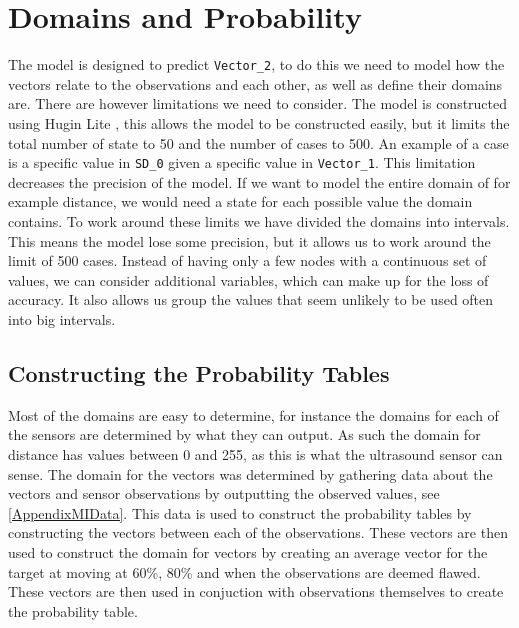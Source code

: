 \section{Domains and Probability}\label{MID}

The model is designed to predict \texttt{Vector\_2}, to do this we need to
model how the vectors relate to the observations and each other, as well as
define their domains are. There are however limitations we need to consider. The
model is constructed using Hugin Lite \citep{Hugin}, this allows the model to
be constructed easily, but it limits the total number of state to 50 and
the number of cases to 500. An example of a case is a specific value in \texttt{SD\_0}
given a specific value in \texttt{Vector\_1}. This limitation decreases the
precision of the model. If we want to model the entire domain of for example
distance, we would need a state for each possible value the domain
contains. To work around these limits we have divided
the domains into intervals. This means the model lose some precision, but it
allows us to work around the limit of 500 cases. Instead of having only a few
nodes with a continuous set of values, we can consider additional variables,
which can  make up for the loss of accuracy. It also allows us group the values
that seem unlikely to be used often into big intervals.


\subsection{Constructing the Probability Tables}

Most of the domains are easy to determine, for instance the domains for each of
the sensors are determined by what they can output. As such the domain for
distance has values between 0 and 255, as this is what the ultrasound sensor
can sense. The domain for the vectors was determined by gathering data about the
vectors and sensor observations by outputting the observed values, see
\autoref{AppendixMIData}. This data is used to construct the
probability tables by constructing the vectors between each of the
observations. These vectors are then used to construct the domain for vectors by creating an average vector for
the target at moving at 60\%, 80\% and when the observations are deemed flawed.
These vectors are then used in conjuction with observations themselves to create
the probability table.\nl



